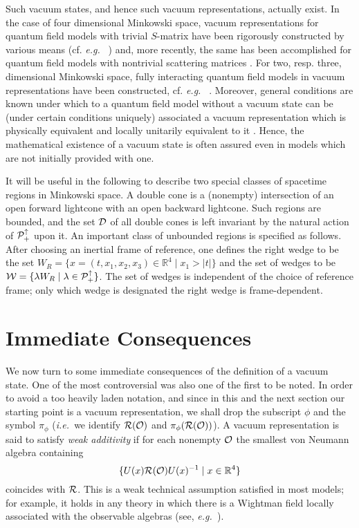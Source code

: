 \documentclass[12pt]{article}
\newcommand{\ie}{{\it i.e.\ }}
\newcommand{\eg}{{\it e.g.\ }}
\def\Ds{{\cal D}}
\def\Os{{\cal O}}
\def\Ps{{\cal P}}
\def\Rs{{\cal R}}
\def\Ws{{\cal W}}
\def\Pid{{\Ps_+ ^{\uparrow}}}
\def\RR{{\mathbb R}}
\begin{document}
     Such vacuum states, and hence such vacuum representations,
actually exist. In the case of four dimensional Minkowski space,
vacuum representations for quantum field models with trivial
$S$-matrix have been rigorously constructed by various means (cf. \eg
\cite{WiGa,Ar2,BLT,GlJa2,BrGuLo3}) and, more recently, the same has been
accomplished for quantum field models with nontrivial scattering
matrices \cite{GrLe,BuSu2,BS6}. For two, resp. three, dimensional
Minkowski space, fully interacting quantum field models in vacuum
representations have been constructed, cf. \eg
\cite{GlJa,GlJa2,Le3,BLT}. Moreover, general conditions are known under
which to a quantum field model without a vacuum state can be (under
certain conditions uniquely) associated a vacuum representation which
is physically equivalent and locally unitarily equivalent to it
\cite{BuFr,BuWa,Dy}. Hence, the mathematical existence of a vacuum
state is often assured even in models which are not initially provided
with one.

     It will be useful in the following to describe two special
classes of spacetime regions in Minkowski space. A double cone is a 
(nonempty) intersection of an open forward lightcone with an open backward
lightcone. Such regions are bounded, and the set $\Ds$ of all double
cones is left invariant by the natural action of $\Pid$ upon it. An
important class of unbounded regions is specified as follows.
After choosing an inertial frame of reference, one defines the right wedge
to be the set \newline
$W_R = \{ x = (t,x_1,x_2,x_3) \in \RR^4 \mid x_1 > \vert t \vert \}$
and the set of wedges to be \newline
$\Ws = \{ \lambda W_R \mid \lambda \in \Pid \}$.
The set of wedges is independent of the choice of reference frame;
only which wedge is designated the right wedge is frame-dependent.

\section{Immediate Consequences} \label{first}

     We now turn to some immediate consequences of the definition of a
vacuum state. One of the most controversial was also one of the first
to be noted. In order to avoid a too heavily laden notation, and since
in this and the next section our starting point is a vacuum
representation, we shall drop the subscript $\phi$ and the symbol
$\pi_\phi$ (\ie we identify $\Rs(\Os)$ and $\pi_\phi(\Rs(\Os))$). A 
vacuum representation is said to satisfy {\it weak additivity} if for 
each nonempty $\Os$ the smallest von Neumann algebra containing
%
$$\{ U(x) \Rs(\Os) U(x)^{-1} \mid x \in \RR^4 \} $$
%
coincides with $\Rs$. This is a weak technical assumption satisfied in 
most models; for example, it holds in any theory in which there is a 
Wightman field locally associated with the observable algebras 
(see, \eg \cite{BW1,BW2,DrSuWi}). 
\end{document}
